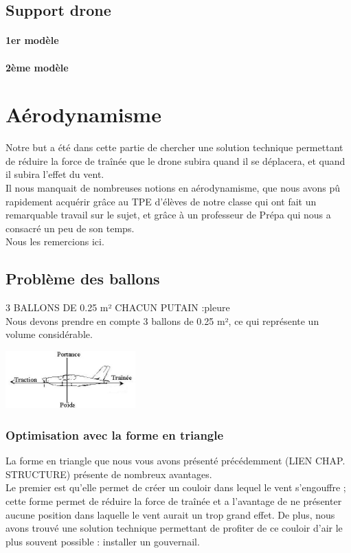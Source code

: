 \documentclass[a4paper,11pt]{article}
\begin{document}
\subsection{Support drone}

\paragraph{1er modèle}

\paragraph{2ème modèle}


\section{Aérodynamisme}
	Notre but a été dans cette partie de chercher une solution technique permettant de réduire la force de traînée que le drone subira quand il se déplacera, et quand il subira l'effet du vent. \\
	Il nous manquait de nombreuses notions en aérodynamisme, que nous avons pû rapidement acquérir grâce au TPE d'élèves de notre classe qui ont fait un remarquable travail sur le sujet, et grâce à un professeur de Prépa qui nous a consacré un peu de son temps.\\
	Nous les remercions ici.
\subsection{Problème des ballons}
	3 BALLONS DE 0.25 m² CHACUN PUTAIN :pleure\\
	Nous devons prendre en compte 3 ballons de 0.25 m², ce qui représente un volume considérable.\\
	\begin{center}
		\includegraphics[width=5cm]{../Images/portance.jpg}
	\end{center}
\subsubsection{Optimisation avec la forme en triangle}
	La forme en triangle que nous vous avons présenté précédemment (LIEN CHAP. STRUCTURE) présente de nombreux avantages.
	\\
	Le premier est qu'elle permet de créer un couloir dans lequel le vent s'engouffre ; cette forme permet de réduire la force de traînée et a l'avantage de ne présenter aucune position dans laquelle le vent aurait un trop grand effet.
	De plus, nous avons trouvé une solution technique permettant de profiter de ce couloir d'air le plus souvent possible : installer un gouvernail.
\end{document}
